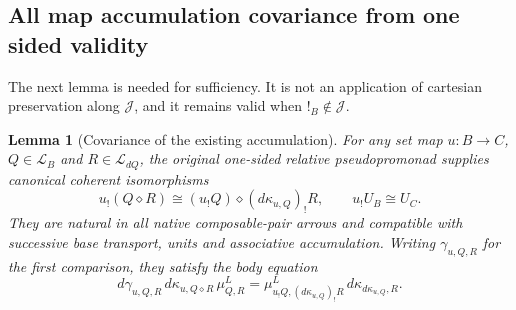 \documentclass[11pt,a4paper]{article}
\newtheorem{lemma}[theorem]{Lemma}
\theoremstyle{definition}
\newcommand{\Lcat}{\mathcal L}
\newcommand{\J}{\mathcal J}
\newcommand{\diamondc}{\mathbin{\diamond}}
\begin{document}
\subsection{All map accumulation covariance from one sided validity}
The next lemma is needed for sufficiency. It is not an application of
cartesian preservation along $\J$, and it remains valid when
$!_B\notin\J$.

\begin{lemma}[Covariance of the existing accumulation]\label{lem:covariance}
For any set map $u:B\to C$, $Q\in\Lcat_B$ and $R\in\Lcat_{dQ}$, the
original one-sided relative pseudopromonad supplies canonical coherent
isomorphisms
\begin{equation}\label{eq:accum-covariance}
 u_!(Q\diamondc R)\cong
       (u_!Q)\diamondc(d\kappa_{u,Q})_!R,\qquad
 u_!U_B\cong U_C.
\end{equation}
They are natural in all native composable-pair arrows and compatible with
successive base transport, units and associative accumulation. Writing
$\gamma_{u,Q,R}$ for the first comparison, they satisfy the body equation
\begin{equation}\label{eq:covariance-body}
 d\gamma_{u,Q,R}\,d\kappa_{u,Q\diamondc R}\,\mu^L_{Q,R}
 =
 \mu^L_{u_!Q,(d\kappa_{u,Q})_!R}\,
 d\kappa_{d\kappa_{u,Q},R}.
\end{equation}
\end{lemma}
\end{document}

